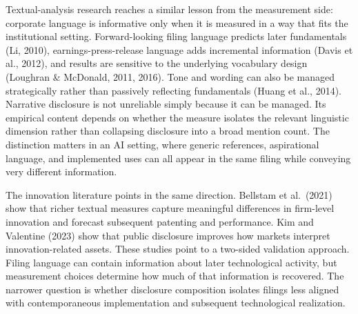 Textual-analysis research reaches a similar lesson from the measurement side: corporate language is informative only when it is measured in a way that fits the institutional setting. Forward-looking filing language predicts later fundamentals (Li, 2010), earnings-press-release language adds incremental information (Davis et al., 2012), and results are sensitive to the underlying vocabulary design (Loughran \& McDonald, 2011, 2016). Tone and wording can also be managed strategically rather than passively reflecting fundamentals (Huang et al., 2014). Narrative disclosure is not unreliable simply because it can be managed. Its empirical content depends on whether the measure isolates the relevant linguistic dimension rather than collapsing disclosure into a broad mention count. The distinction matters in an AI setting, where generic references, aspirational language, and implemented uses can all appear in the same filing while conveying very different information.

The innovation literature points in the same direction. Bellstam et al.~(2021) show that richer textual measures capture meaningful differences in firm-level innovation and forecast subsequent patenting and performance. Kim and Valentine (2023) show that public disclosure improves how markets interpret innovation-related assets. These studies point to a two-sided validation approach. Filing language can contain information about later technological activity, but measurement choices determine how much of that information is recovered. The narrower question is whether disclosure composition isolates filings less aligned with contemporaneous implementation and subsequent technological realization.
